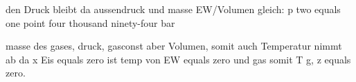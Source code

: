 den Druck bleibt da aussendruck und masse EW/Volumen gleich: p two equals one point four thousand ninety-four bar

masse des gases, druck, gasconst aber Volumen, somit auch Temperatur nimmt ab da x Eis equals zero ist temp von EW equals zero und gas somit T g, z equals zero.